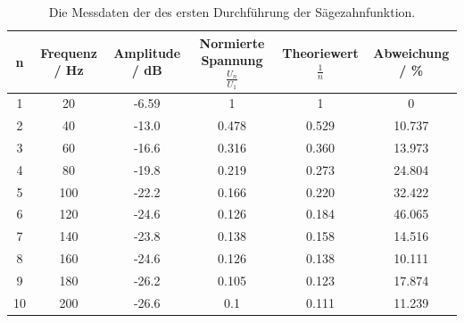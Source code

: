 \begin{table}[H]
  \begin{center}
    \begin{tabular}{ |c|c|c|c|c|c| }
      \hline
      n  & Frequenz / Hz & Amplitude / dB & Normierte Spannung $\frac{U_n}{U_1}$ & Theoriewert $\frac{1}{n}$ & Abweichung / \% \\
      \hline
      1  & 20            & -6.59          & 1                                    & 1                         & 0               \\
      2  & 40            & -13.0          & 0.478                                & 0.529                     & 10.737          \\
      3  & 60            & -16.6          & 0.316                                & 0.360                     & 13.973          \\
      4  & 80            & -19.8          & 0.219                                & 0.273                     & 24.804          \\
      5  & 100           & -22.2          & 0.166                                & 0.220                     & 32.422          \\
      6  & 120           & -24.6          & 0.126                                & 0.184                     & 46.065          \\
      7  & 140           & -23.8          & 0.138                                & 0.158                     & 14.516          \\
      8  & 160           & -24.6          & 0.126                                & 0.138                     & 10.111          \\
      9  & 180           & -26.2          & 0.105                                & 0.123                     & 17.874          \\
      10 & 200           & -26.6          & 0.1                                  & 0.111                     & 11.239          \\
      \hline
    \end{tabular}
    \caption{\label{ramp-1-table}Die Messdaten der des ersten Durchführung der Sägezahnfunktion.}
  \end{center}
\end{table}
